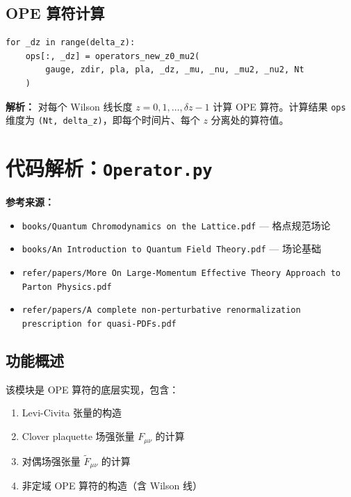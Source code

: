 \documentclass[12pt,a4paper]{ctexart}
\begin{document}
\subsection{OPE 算符计算}

\begin{lstlisting}[caption={对所有 z 计算 OPE 算符}]
for _dz in range(delta_z):
    ops[:, _dz] = operators_new_z0_mu2(
        gauge, zdir, pla, pla, _dz, _mu, _nu, _mu2, _nu2, Nt
    )
\end{lstlisting}

\textbf{解析：}
对每个 Wilson 线长度 $z = 0, 1, \ldots, \delta z - 1$ 计算 OPE 算符。计算结果 \texttt{ops} 维度为 \texttt{(Nt, delta\_z)}，即每个时间片、每个 $z$ 分离处的算符值。

\section{代码解析：\texttt{Operator.py}}
\label{sec:operator}

\textbf{参考来源：}
\begin{itemize}
    \item \texttt{books/Quantum Chromodynamics on the Lattice.pdf} — 格点规范场论
    \item \texttt{books/An Introduction to Quantum Field Theory.pdf} — 场论基础
    \item \texttt{refer/papers/More On Large-Momentum Effective Theory Approach to Parton Physics.pdf}
    \item \texttt{refer/papers/A complete non-perturbative renormalization prescription for quasi-PDFs.pdf}
\end{itemize}

\subsection{功能概述}

该模块是 OPE 算符的底层实现，包含：
\begin{enumerate}
    \item Levi-Civita 张量的构造
    \item Clover plaquette 场强张量 $F_{\mu\nu}$ 的计算
    \item 对偶场强张量 $\tilde{F}_{\mu\nu}$ 的计算
    \item 非定域 OPE 算符的构造（含 Wilson 线）
\end{enumerate}
\end{document}
